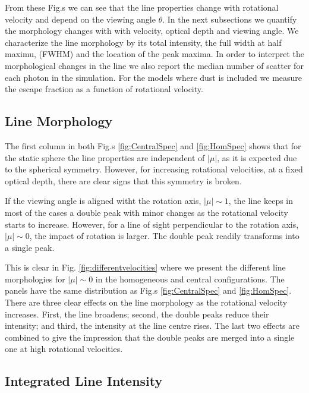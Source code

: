 \documentclass{emulateapj}
\newcommand{\ly}{{\ifmmode{{\rm Ly}\alpha~}\else{Ly$\alpha$~}\fi}}
\begin{document}
From these Fig.s we can see that the line properties change with
rotational velocity and depend on the viewing angle $\theta$.  
In the next subsections we quantify the morphology changes with with
velocity, optical depth and viewing angle.  
We characterize the line morphology by its total intensity, the full
width at half maximu, (FWHM) and the location of the peak maxima. 
In order to interpret the
morphological changes in the line we also report the median number of
scatter for each \ly photon in the simulation. 
For the models where dust is included we measure the escape fraction
as a function of rotational velocity.   

\subsection{Line Morphology}
\label{sec:angles}

The first column in both Fig.s \ref{fig:CentralSpec} and
\ref{fig:HomSpec} shows that for the static sphere the line properties
are independent of $|\mu|$, as it is expected due
to the spherical symmetry. 
However, for increasing rotational velocities, at a fixed optical
depth, there are clear signs that this symmetry is broken. 

If the viewing angle is aligned witht the rotation axis, $|\mu|\sim
1$, the \ly line keeps in most of the cases a double peak with minor
changes as the rotational velocity starts to increase. 
However, for a line of sight perpendicular to the rotation axis,
$|\mu|\sim 0$, the impact of  rotation is larger.  
The double peak readily transforms into a single peak.

This is clear in  Fig. \ref{fig:differentvelocities} where we
present the different line morphologies for $|\mu|\sim 0$ in the
homogeneous and central configurations.  
The panels have the same distribution as Fig.s \ref{fig:CentralSpec}
and \ref{fig:HomSpec}.    
There are three clear effects on the line morphology as the rotational
velocity increases.  
First, the line broadens; second, the double peaks reduce their intensity; and
third, the intensity at the line centre rises. 
The last two effects are combined to give the impression that the double
peaks are merged into a single one at high rotational velocities. 



\subsection{Integrated Line Intensity}
\end{document}
